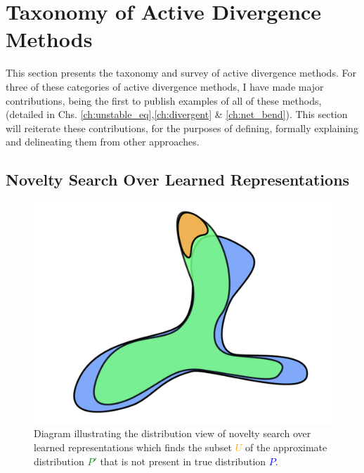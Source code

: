 \section{Taxonomy of Active Divergence Methods}
\label{c6:sec:taxonomy}

This section presents the taxonomy and survey of active divergence methods. 
For three of these categories of active divergence methods, I have made major contributions, being the first to publish examples of all of these methods, (detailed in Chs. \ref{ch:unstable_eq},\ref{ch:divergent} \& \ref{ch:net_bend}).
This section will reiterate these contributions, for the purposes of defining, formally explaining and delineating them from other approaches.

\subsection{Novelty Search Over Learned Representations}
\label{survey:noveltysearch}

\begin{figure}[!htbp]
    \centering
    \includegraphics[width=1\textwidth]{figures/c6_active_div/diagrams/novelty_search.png}
    \caption[Diagram illustrating the distribution view of novelty search over learned representations.]{Diagram illustrating the distribution view of novelty search over learned representations which finds the subset \textcolor{orange}{$U$} of the approximate distribution \textcolor{green}{$P'$} that is not present in true distribution \textcolor{blue}{$P$}.}
  \label{fig:c6:novelty-search}
  \end{figure}

